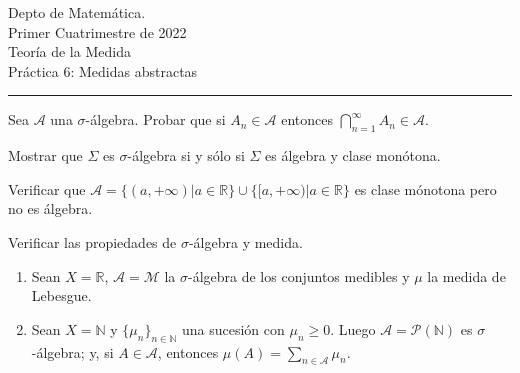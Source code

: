 \documentclass{book}
\newcommand{\rr}{\mathbb{R}}
\newcommand{\nn}{\mathbb{N}}
\begin{document}


\begin{large}
\begin{bfseries} %
        \noindent Depto de Matem\'atica.\\
        Primer Cuatrimestre de 2022\\                                                                                                                                                                                                                                                                                                                                                
        Teoría de la Medida \\
        Práctica 6: Medidas abstractas

\end{bfseries}
\end{large}
\par\noindent\rule{\textwidth}{.5pt}






\begin{ejer}{}
Sea $\mathcal{A}$ una $\sigma$-álgebra.
Probar que si $A_n \in \mathcal{A}$ entonces $\bigcap\limits_{n=1}^{\infty} A_n \in \mathcal{A}$.
\end{ejer}

\begin{ejer}{}
 Mostrar que  $\Sigma$ es $\sigma$-álgebra si y sólo si $\Sigma$ es álgebra y clase monótona.
\end{ejer}


\begin{ejer}{}
 Verificar que $\mathcal{A}=\{(a,+\infty)|a \in \rr\}\cup \{[a,+\infty)|a \in \rr\}$ es clase mónotona pero no 
es álgebra.
\end{ejer}

\begin{ejer}{} Verificar las propiedades de $\sigma$-álgebra y medida.
\begin{enumerate}
\item Sean $X=\rr$, $\mathcal{A}=\mathcal{M}$ la $\sigma$-álgebra de los conjuntos medibles y $\mu$ la medida de Lebesgue.
\item Sean $X=\nn$ y $\{\mu_n\}_{n \in \nn}$ una sucesión con $\mu_n\geq 0$. 
Luego $\mathcal{A}=\mathcal{P}(\nn)$ es $\sigma$-álgebra; y, si $A\in \mathcal{A}$, entonces 
$\mu(A)=\sum\limits_{n \in \mathcal{A}} \mu_n$.
\end{enumerate}
\end{ejer}
\end{document}
